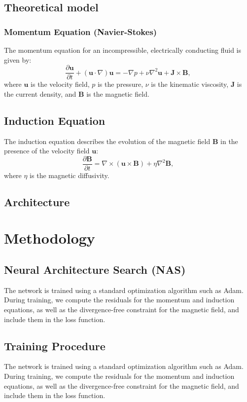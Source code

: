 \documentclass[12pt]{article}
\begin{document}
\subsection{Theoretical model}
\subsubsection{Momentum Equation (Navier-Stokes)}
The momentum equation for an incompressible, electrically conducting fluid is given by:
\begin{equation}
\frac{\partial \mathbf{u}}{\partial t} + (\mathbf{u} \cdot \nabla) \mathbf{u} = -\nabla p + \nu \nabla^2 \mathbf{u} + \mathbf{J} \times \mathbf{B},
\end{equation}
where \( \mathbf{u} \) is the velocity field, \( p \) is the pressure, \( \nu \) is the kinematic viscosity, \( \mathbf{J} \) is the current density, and \( \mathbf{B} \) is the magnetic field.

\subsection{Induction Equation}
The induction equation describes the evolution of the magnetic field \( \mathbf{B} \) in the presence of the velocity field \( \mathbf{u} \):
\begin{equation}
\frac{\partial \mathbf{B}}{\partial t} = \nabla \times (\mathbf{u} \times \mathbf{B}) + \eta \nabla^2 \mathbf{B},
\end{equation}
where \( \eta \) is the magnetic diffusivity.

\subsection{Architecture}

\section{Methodology}

\subsection{Neural Architecture Search (NAS)}
The network is trained using a standard optimization algorithm such as Adam. During training, we compute the residuals for the momentum and induction equations, as well as the divergence-free constraint for the magnetic field, and include them in the loss function.

\subsection{Training Procedure}
The network is trained using a standard optimization algorithm such as Adam. During training, we compute the residuals for the momentum and induction equations, as well as the divergence-free constraint for the magnetic field, and include them in the loss function.
\end{document}
